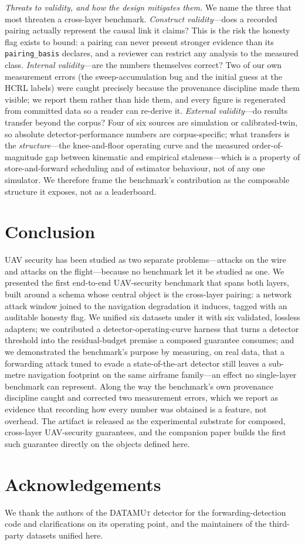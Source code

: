 \documentclass[conference]{IEEEtran}
\newcommand{\dataset}[1]{\textsc{#1}}
\newcommand{\code}[1]{\texttt{#1}}
\begin{document}
\emph{Threats to validity, and how the design mitigates them.} We name the three
that most threaten a cross-layer benchmark. \emph{Construct validity}---does a
recorded pairing actually represent the causal link it claims? This is the risk
the honesty flag exists to bound: a pairing can never present stronger evidence
than its \code{pairing\_basis} declares, and a reviewer can restrict any analysis
to the measured class. \emph{Internal validity}---are the numbers themselves
correct? Two of our own measurement errors (the sweep-accumulation bug and the
initial guess at the \dataset{HCRL} labels) were caught precisely because the
provenance discipline made them visible; we report them rather than hide them,
and every figure is regenerated from committed data so a reader can re-derive it.
\emph{External validity}---do results transfer beyond the corpus? Four of six
sources are simulation or calibrated-twin, so absolute detector-performance
numbers are corpus-specific; what transfers is the \emph{structure}---the
knee-and-floor operating curve and the measured order-of-magnitude gap between
kinematic and empirical staleness---which is a property of store-and-forward
scheduling and of estimator behaviour, not of any one simulator. We therefore
frame the benchmark's contribution as the composable structure it exposes, not
as a leaderboard.

\section{Conclusion}
\label{sec:conclusion}
UAV security has been studied as two separate problems---attacks on the wire and
attacks on the flight---because no benchmark let it be studied as one. We
presented the first end-to-end UAV-security benchmark that spans both layers,
built around a schema whose central object is the cross-layer pairing: a network
attack window joined to the navigation degradation it induces, tagged with an
auditable honesty flag. We unified six datasets under it with six validated,
lossless adapters; we contributed a detector-operating-curve harness that turns a
detector threshold into the residual-budget premise a composed guarantee
consumes; and we demonstrated the benchmark's purpose by measuring, on real data,
that a forwarding attack tuned to evade a state-of-the-art detector still leaves a
sub-metre navigation footprint on the same airframe family---an effect no
single-layer benchmark can represent. Along the way the benchmark's own
provenance discipline caught and corrected two measurement errors, which we
report as evidence that recording how every number was obtained is a feature, not
overhead. The artifact is released as the experimental substrate for composed,
cross-layer UAV-security guarantees, and the companion paper builds the first
such guarantee directly on the objects defined here.

\section*{Acknowledgements}
We thank the authors of the \dataset{DATAMUt} detector for the
forwarding-detection code and clarifications on its operating point, and the
maintainers of the third-party datasets unified here.



\end{document}
